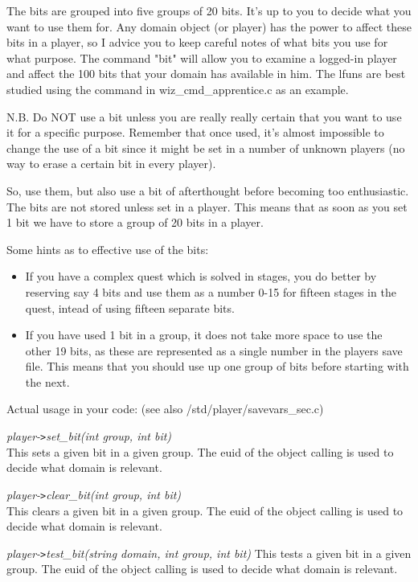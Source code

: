 The bits are grouped into five groups of 20 bits. It's up to you to
decide what you want to use them for. Any domain object (or player)
has the power to affect these bits in a player, so I advice you to 
keep careful notes of what bits you use for what purpose. The command
"bit" will allow you to examine a logged-in player and affect the 100
bits that your domain has available in him. The lfuns are best studied
using the command in wiz\_cmd\_apprentice.c as an example.

N.B. Do NOT use a bit unless you are really really certain that you want
to use it for a specific purpose. Remember that once used, it's almost
impossible to change the use of a bit since it might be set in a number of
unknown players (no way to erase a certain bit in every player).

So, use them, but also use a bit of afterthought before becoming too
enthusiastic. The bits are not stored unless set in a player. This means
that as soon as you set 1 bit we have to store a group of 20 bits in a
player.

Some hints as to effective use of the bits:

\begin{itemize}
\item  If you have a complex quest which is solved in stages, you do better
  by reserving say 4 bits and use them as a number 0-15 for fifteen stages
  in the quest, intead of using fifteen separate bits.

\item  If you have used 1 bit in a group, it does not take more space to use the
  other 19 bits, as these are represented as a single number in the players
  save file. This means that you should use up one group of bits before
  starting with the next.
\end{itemize}

Actual usage in your code: (see also /std/player/savevars\_sec.c)

    {\em player-\verb+>+set\_bit(int group, int bit)} \\
    This sets a given bit in a given group. The euid of the object
    calling is used to decide what domain is relevant. 

    {\em player-\verb+>+clear\_bit(int group, int bit)} \\
    This clears a given bit in a given group. The euid of the object
    calling is used to decide what domain is relevant. 

    {\em player-\verb+>+test\_bit(string domain, int group, int bit)}
    This tests a given bit in a given group. The euid of the object
    calling is used to decide what domain is relevant. 


